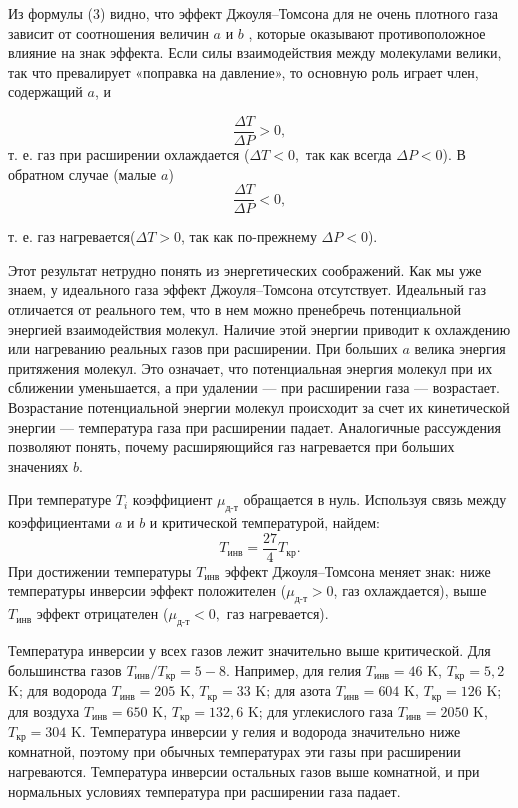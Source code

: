 \documentclass[a4paper, 12pt]{article}
\begin{document}
\indent Из формулы (3) видно, что эффект Джоуля–Томсона для не очень плотного газа зависит от соотношения величин $a$ и $b$ , которые оказывают противоположное влияние на знак эффекта. Если силы взаимодействия между молекулами велики, так что превалирует «поправка на давление», то основную роль играет член, содержащий $a$, и 

\begin{equation*}
	\frac{\Delta T}{\Delta P} > 0,
\end{equation*}
т. е. газ при расширении охлаждается ($\Delta T < 0, $ так
как всегда $\Delta P < 0$). В обратном случае (малые $a$)
\begin{equation*}
	\frac{\Delta T}{\Delta P} < 0,
\end{equation*}


\noindent т. е. газ нагревается($\Delta T > 0$, так как по-прежнему $\Delta P < 0$).

\indent Этот результат нетрудно понять из энергетических соображений. Как мы уже знаем,
у идеального газа эффект Джоуля–Томсона отсутствует. Идеальный газ отличается от реального тем, что в нем можно пренебречь потенциальной энергией взаимодействия молекул. Наличие этой энергии приводит к охлаждению или нагреванию реальных газов при расширении. При больших $a$ велика энергия притяжения молекул. Это означает, что потенциальная энергия молекул при их сближении уменьшается, а при удалении — при расширении газа — возрастает. Возрастание потенциальной энергии молекул происходит за счет их кинетической энергии — температура газа при расширении падает. Аналогичные рассуждения позволяют понять, почему расширяющийся газ нагревается при больших значениях $b$.

\indent При температуре $T_{i}$ коэффициент $\mu_{\text{д-т}}$ обращается в нуль. Используя связь между коэффициентами $a$ и $b$ и критической температурой, найдем:
\begin{equation}
	T_{\text{инв}} = \frac{27}{4}T_{\text{кр}}.
\end{equation} 
При достижении температуры $T_{\text{инв}}$ эффект Джоуля–Томсона меняет знак: ниже температуры инверсии эффект положителен ($\mu_{\text{д-т}} > 0 $, газ охлаждается), выше $T_{\text{инв}}$ эффект отрицателен ($\mu_{\text{д-т}} < 0,$ газ нагревается).

\indent Температура инверсии у всех газов лежит значительно выше критической. Для большинства газов $T_{\text{инв}}/T_{\text{кр}} = 5 - 8$. Например, для гелия $T_{\text{инв}} = 46$ K, $T_{\text{кр}} = 5,2$ K; для водорода $T_{\text{инв}} = 205$ K, $T_{\text{кр}} = 33$ K; для азота $T_{\text{инв}} = 604$ K, $T_{\text{кр}} = 126$ K; для воздуха $T_{\text{инв}} = 650$ K, $T_{\text{кр}} = 132,6$ K; для углекислого газа $T_{\text{инв}} = 2050$ K, $T_{\text{кр}} = 304$ K. Температура инверсии у гелия и водорода значительно ниже комнатной, поэтому при обычных температурах эти газы при расширении нагреваются. Температура инверсии остальных газов выше
комнатной, и при нормальных условиях температура при расширении газа падает.
\end{document}
